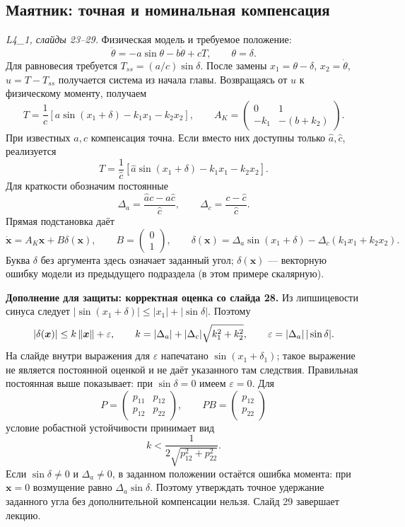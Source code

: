 \subsection{Маятник: точная и номинальная компенсация}

\textit{L4\_1, слайды 23--29.}
Физическая модель и требуемое положение:
\[
 \ddot\theta=-a\sin\theta-b\dot\theta+cT,\qquad \theta=\delta.
\]
Для равновесия требуется $T_{ss}=(a/c)\sin\delta$.
После замены $x_1=\theta-\delta$, $x_2=\dot\theta$,
$u=T-T_{ss}$ получается система из начала главы.
Возвращаясь от $u$ к физическому моменту, получаем
\[
 T=\frac{1}{c}[a\sin(x_1+\delta)-k_1x_1-k_2x_2],
 \qquad A_K=\begin{pmatrix}0&1\\-k_1&-(b+k_2)\end{pmatrix}.
\]
При известных $a,c$ компенсация точна. Если вместо них доступны
только $\widehat a,\widehat c$, реализуется
\[
 T=\frac{1}{\widehat c}
 [\widehat a\sin(x_1+\delta)-k_1x_1-k_2x_2].
\]
Для краткости обозначим постоянные
\[
 \Delta_a=\frac{\widehat a c-a\widehat c}{\widehat c},\qquad
 \Delta_c=\frac{c-\widehat c}{\widehat c}.
\]
Прямая подстановка даёт
\[
 \dot{\bm x}=A_K\bm x+B\delta(\bm x),\qquad
 B=\begin{pmatrix}0\\1\end{pmatrix},\qquad
 \delta(\bm x)=\Delta_a\sin(x_1+\delta)
                   -\Delta_c(k_1x_1+k_2x_2).
\]
Буква $\delta$ без аргумента здесь означает заданный угол;
$\delta(\bm x)$ --- векторную ошибку модели из предыдущего подраздела
(в этом примере скалярную).

\textbf{Дополнение для защиты: корректная оценка со слайда 28.}
Из липшицевости синуса следует
$|\sin(x_1+\delta)|\le|x_1|+|\sin\delta|$. Поэтому
\[
 |\delta(\bm x)|\le k\left\lVert\bm x\right\rVert+\varepsilon,\qquad
 k=|\Delta_a|+|\Delta_c|\sqrt{k_1^2+k_2^2},\qquad
 \varepsilon=|\Delta_a|\,|\sin\delta|.
\]
На слайде внутри выражения для $\varepsilon$ напечатано
$\sin(x_1+\delta_1)$; такое выражение не является постоянной оценкой
и не даёт указанного там следствия. Правильная постоянная выше
показывает: при $\sin\delta=0$ имеем $\varepsilon=0$.
Для
\[
 P=\begin{pmatrix}p_{11}&p_{12}\\p_{12}&p_{22}\end{pmatrix},\qquad
 PB=\begin{pmatrix}p_{12}\\p_{22}\end{pmatrix}
\]
условие робастной устойчивости принимает вид
\[
 k<\frac{1}{2\sqrt{p_{12}^2+p_{22}^2}}.
\]
Если $\sin\delta\ne0$ и $\Delta_a\ne0$, в заданном положении
остаётся ошибка момента: при $\bm x=0$ возмущение равно
$\Delta_a\sin\delta$. Поэтому утверждать точное удержание заданного
угла без дополнительной компенсации нельзя. Слайд 29 завершает лекцию.

